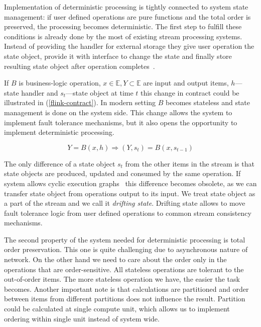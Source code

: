 
\label{motivation-section}

Implementation of deterministic processing is tightly connected to system state management: if user defined operations are pure functions and the total order is preserved, the processing becomes deterministic. The first step to fulfill these conditions is already done by the most of existing stream processing systems. Instead of providing the handler for external storage they give user operation the state object, provide it with interface to change the state and finally store resulting state object after operation completes~\cite{carbone2015apache, apache:storm, Noghabi:2017:SSS:3137765.3137770}.

If $B$ is business-logic operation, $x \in \mathbb{E}, Y \subset \mathbb{E}$ are input and output items, $h$---state handler and $s_t$---state object at time $t$ this change in contract could be illustrated in (\ref{flink-contract}). In modern setting $B$ becomes stateless and state management is done on the system side. This change allows the system to implement fault tolerance mechanisms, but it also opens the opportunity to implement deterministic processing.

\begin{equation}
\label{flink-contract}
Y = B(x, h) \Rightarrow (Y, s_t) = B(x, s_{t-1}) 
\end{equation}

The only difference of a state object $s_t$ from the other items in the stream is that state objects are produced, updated and consumed by the same operation. If system allows cyclic execution graphs~\cite{Murray:2013:NTD:2517349.2522738} this difference becomes obsolete, as we can transfer state object from operations output to its input. We treat state object as a part of the stream and we call it {\it drifting state}. Drifting state allows to move fault tolerance logic from user defined operations to common stream consistency mechanisms.

The second property of the system needed for deterministic processing is total order preservation. This one is quite challenging due to asynchronous nature of network. On the other hand we need to care about the order only in the operations that are order-sensitive. All stateless operations are tolerant to the out-of-order items. The more stateless operation we have, the easier the task becomes. Another important note is that calculations are partitioned and order between items from different partitions does not influence the result. Partition could be calculated at single compute unit, which allows us to implement ordering within single unit instead of system wide.

